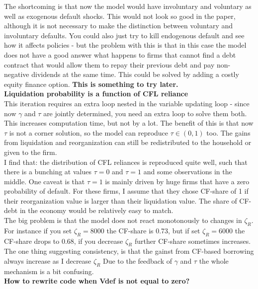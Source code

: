 \documentclass[12pt]{article}
\begin{document}
The shortcoming is that now the model would have involuntary and voluntary as well as exogenous default shocks. This would not look so good in the paper, although it is not necessary to make the distinction between voluntary and involuntary defaults. You could also just try to kill endogenous default and see how it affects policies - but the problem with this is that in this case the model does not have a good answer what happens to firms that cannot find a debt contract that would allow them to repay their previous debt and pay non-negative dividends at the same time.
This could be solved by adding a costly equity finance option. \textbf{This is something to try later.} \vspace{3mm} \\
\textbf{Liquidation probability is a function of CFL reliance} \\
This iteration requires an extra loop nested in the variable updating loop - since now $\gamma$ and $\tau$ are jointly determined, you need an extra loop to solve them both. This increases computation time, but not by a lot. The benefit of this is that now $\tau$ is not a corner solution, so the model can reproduce $\tau \in (0,1)$ too. The gains from liquidation and reorganization can still be redistributed to the household or given to the firm. \vspace{3mm} \\
I find that: the distribution of CFL reliances is reproduced quite well, such that there is a bunching at values $\tau = 0$ and $\tau = 1$ and some observations in the middle. One caveat is that $\tau = 1$ is mainly driven by huge firms that have a zero probability of default. For these firms, I assume that they chose CF-share of 1 if their reorganization value is larger than their liquidation value. The share of CF-debt in the economy would be relatively easy to match.   \vspace{3mm} \\
The big problem is that the model does not react monotonously to changes in $\zeta_R$. For instance if you set $\zeta_R = 8000$ the CF-share is 0.73, but if set $\zeta_R = 6000$ the CF-share drops to 0.68, if you decrease $\zeta_R$ further CF-share sometimes increases. The one thing suggesting consistency, is that the gainst from CF-based borrowing always increase as I decrease $\zeta_R$ Due to the feedback of $\gamma$ and $\tau$ the whole mechanism is a bit confusing. \vspace{3mm} \\
\textbf{How to rewrite code when Vdef is not equal to zero?} \\
\end{document}
